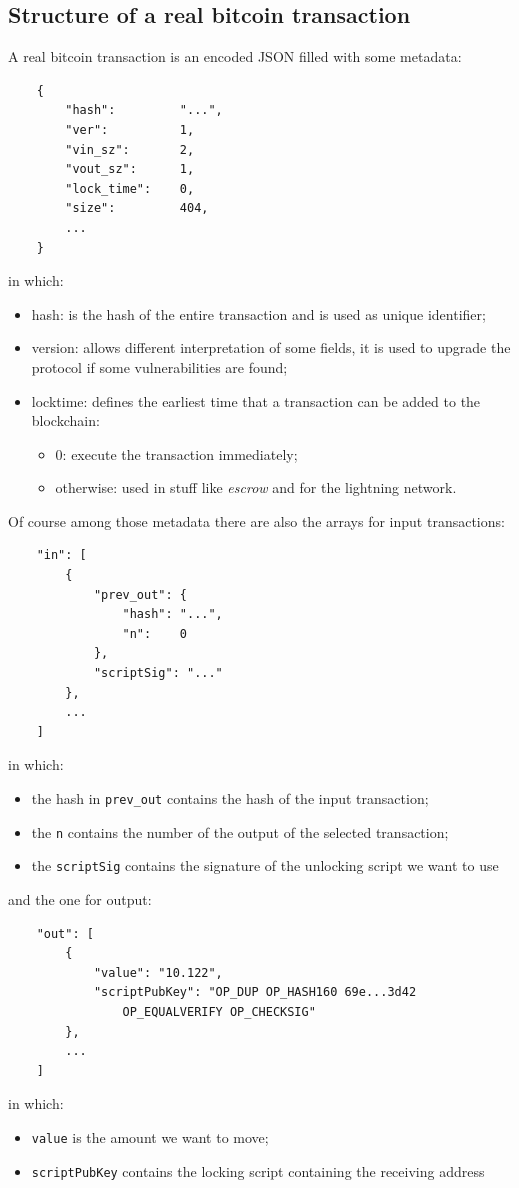 \subsection{Structure of a real bitcoin transaction}
A real bitcoin transaction is an encoded JSON filled with some metadata:
\begin{verbatim}
    {
        "hash":         "...",
        "ver":          1,
        "vin_sz":       2,
        "vout_sz":      1,
        "lock_time":    0,
        "size":         404,
        ...
    }
\end{verbatim}
in which:
\begin{itemize}
    \item hash: is the hash of the entire transaction and is used as unique identifier;
    \item version: allows different interpretation of some fields, it is used to upgrade the protocol if some vulnerabilities are found;
    \item locktime: defines the earliest time that a transaction can be added to the blockchain:
    \begin{itemize}
        \item 0: execute the transaction immediately;
        \item otherwise: used in stuff like \emph{escrow} and for the lightning network.
    \end{itemize}
\end{itemize}

Of course among those metadata there are also the arrays for input transactions:
\begin{verbatim}
    "in": [
        {
            "prev_out": {
                "hash": "...",
                "n":    0
            },
            "scriptSig": "..."
        },
        ...
    ]
\end{verbatim}
in which:
\begin{itemize}
    \item the hash in \verb|prev_out| contains the hash of the input transaction;
    \item the \verb|n| contains the number of the output of the selected transaction;
    \item the \verb|scriptSig| contains the signature of the unlocking script we want to use
\end{itemize}

and the one for output:
\begin{verbatim}
    "out": [
        {
            "value": "10.122",
            "scriptPubKey": "OP_DUP OP_HASH160 69e...3d42
                OP_EQUALVERIFY OP_CHECKSIG"
        },
        ...
    ]
\end{verbatim}
in which:
\begin{itemize}
    \item \verb|value| is the amount we want to move;
    \item \verb|scriptPubKey| contains the locking script containing the receiving address 
\end{itemize}


